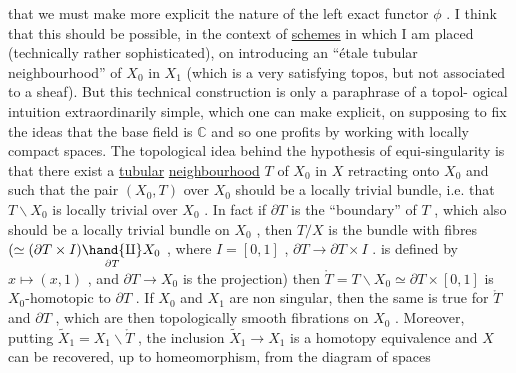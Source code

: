 
that we must make more explicit the nature of the left exact
functor $\phi$ . I think that this should be possible, in the context
of \uline{schemes} in which I am placed (technically rather sophisticated),
on introducing an ``étale tubular neighbourhood'' of $X_0$ in $X_1$
(which is a very satisfying topos, but not associated to a sheaf).
But this technical construction is only a paraphrase of a topol-%
ogical intuition extraordinarily simple, which one can make
explicit, on supposing to fix the ideas that the base field is
$\mathbb{C}$ and so one profits by working with locally compact spaces.
The topological idea behind the hypothesis of equi-singularity is
that there exist a \uline{tubular} \uline{neighbourhood} $T$ of $X_0$ in $X$
retracting onto $X_0$ and such that the pair $(X_0, T)$ over $X_0$
should be a locally trivial bundle, i.e. that $T\backslash X_0$ is locally
trivial over $X_0$ . In fact if $\partial T$ is the ``boundary'' of $T$ ,
which also should be a locally trivial bundle on $X_0$ , then $T/X$
is the bundle with fibres
$(\simeq (\partial T \times I) \underset{\partial T}{\hand{\amalg}} X_0$ , where $I = [0, 1]$ , $\partial T \to \partial T \times I$ . is defined
by $x \longmapsto (x, 1)$ , and $\partial T \to X_0$ is the projection) then
$\mathring{T} = T\backslash X_0 \simeq \partial T \times [0, 1]$ is $X_0$-homotopic to $\partial T$ . If $X_0$ and
$X_1$ are non singular, then the same is true for $\mathring{T}$ and $\partial T$ ,
which are then topologically smooth fibrations on $X_0$ . Moreover,
putting $\tilde{X}_1 = X_1\backslash\mathring{T}$ , the inclusion $\tilde{X}_1 \to X_1$ is a homotopy equivalence
and $X$ can be recovered, up to homeomorphism, from the diagram
of spaces

